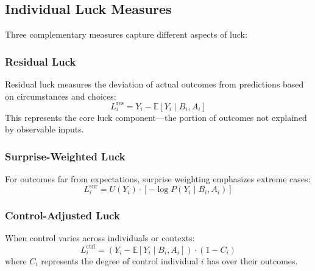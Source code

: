   \subsection{Individual Luck Measures}

  Three complementary measures capture different aspects of luck:

  \subsubsection{Residual Luck}

  Residual luck measures the deviation of actual outcomes from
  predictions based on circumstances and choices:
  \begin{equation}
    L_{i}^{\text{res}}= Y_{i} - \mathbb{E}[Y_{i} \mid B_{i}, A_{i}]
  \end{equation}
  This represents the core luck component—the portion of outcomes not explained
  by observable inputs.

  \subsubsection{Surprise-Weighted Luck}

  For outcomes far from expectations, surprise weighting emphasizes extreme
  cases:
  \begin{equation}
    L_{i}^{\text{sur}}= U(Y_{i}) \cdot \left[-\log P(Y_{i} \mid B_{i}, A_{i}
    )\right]
  \end{equation}

  \subsubsection{Control-Adjusted Luck}

  When control varies across individuals or contexts:
  \begin{equation}
    L_{i}^{\text{ctrl}}= (Y_{i} - \mathbb{E}[Y_{i} \mid B_{i}, A_{i}]) \cdot
    (1 - C_{i})
  \end{equation}
  where $C_{i}$ represents the degree of control individual $i$ has over
  their outcomes.

